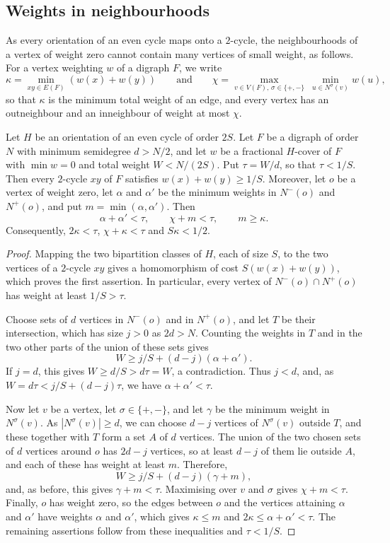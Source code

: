 \subsection{Weights in neighbourhoods}\label{sec:prelim-weights}
As every orientation of an even cycle maps onto a $2$-cycle, the neighbourhoods of a vertex of weight zero cannot contain many vertices of small weight, as follows.
For a vertex weighting $w$ of a digraph $F$, we write
\[
 \kappa=\min_{xy\in E(F)}(w(x)+w(y))\qquad\text{and}\qquad
 \chi=\max_{v\in V(F),\,\sigma\in\{+,-\}}\ \min_{u\in N^\sigma(v)}w(u),
\]
so that $\kappa$ is the minimum total weight of an edge, and every vertex has an outneighbour and an inneighbour of weight at most $\chi$.

\begin{lemma}\label{norm391:savings}
Let $H$ be an orientation of an even cycle of order $2S$.
Let $F$ be a digraph of order $N$ with minimum semidegree $d>N/2$,
and let $w$ be a fractional $H$-cover of $F$ with
$\min w=0$ and total weight $W<N/(2S)$. Put $\tau=W/d$, so that $\tau<1/S$.
Then every $2$-cycle $xy$ of $F$ satisfies
$w(x)+w(y)\ge1/S$.
Moreover, let $o$ be a vertex of weight zero, let $\alpha$ and $\alpha'$ be the minimum weights in $N^-(o)$ and $N^+(o)$, and put $m=\min(\alpha,\alpha')$. Then
\[
 \alpha+\alpha'<\tau,\qquad \chi+m<\tau,\qquad m\ge\kappa.
\]
Consequently, $2\kappa<\tau$, $\chi+\kappa<\tau$ and
$S\kappa<1/2$.
\end{lemma}
\begin{proof}
Mapping the two bipartition classes of $H$, each of size $S$, to the two vertices of a $2$-cycle $xy$ gives a homomorphism of cost $S(w(x)+w(y))$, which proves the first assertion.
In particular, every vertex of $N^-(o)\cap N^+(o)$ has weight at least $1/S>\tau$.

Choose sets of $d$ vertices in $N^-(o)$ and in $N^+(o)$, and let $T$ be their intersection, which has size $j>0$ as $2d>N$. Counting the weights in $T$ and in the two other parts of the union of these sets gives
\[
 W\ge j/S+(d-j)(\alpha+\alpha').
\]
If $j=d$, this gives $W\ge d/S>d\tau=W$, a contradiction. Thus $j<d$, and, as $W=d\tau<j/S+(d-j)\tau$, we have $\alpha+\alpha'<\tau$.

Now let $v$ be a vertex, let $\sigma\in\{+,-\}$, and let $\gamma$ be the minimum weight in $N^\sigma(v)$.
As $|N^\sigma(v)|\ge d$, we can choose $d-j$ vertices of $N^\sigma(v)$ outside $T$, and these together with $T$ form a set $A$ of $d$ vertices. The union of the two chosen sets of $d$ vertices around $o$ has $2d-j$ vertices, so at least $d-j$ of them lie outside $A$, and each of these has weight at least $m$. Therefore,
\[
 W\ge j/S+(d-j)(\gamma+m),
\]
and, as before, this gives $\gamma+m<\tau$. Maximising over $v$ and $\sigma$ gives $\chi+m<\tau$.
Finally, $o$ has weight zero, so the edges between $o$ and the vertices attaining $\alpha$ and $\alpha'$ have weights $\alpha$ and $\alpha'$, which gives $\kappa\le m$ and
$2\kappa\le\alpha+\alpha'<\tau$. The remaining assertions follow from these inequalities and $\tau<1/S$.
\end{proof}

